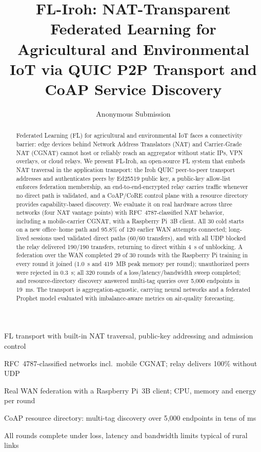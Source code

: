\documentclass[a4paper,fleqn]{cas-dc}
\begin{document}
\let\WriteBookmarks\relax
\def\floatpagepagefraction{1}
\def\textpagefraction{.001}


\title[mode = title]{FL-Iroh: NAT-Transparent Federated Learning for Agricultural and Environmental IoT via QUIC P2P Transport and CoAP Service Discovery}

\author{Anonymous Submission}

\begin{abstract}
Federated Learning (FL) for agricultural and environmental IoT faces a connectivity barrier: edge devices behind Network Address Translators (NAT) and Carrier-Grade NAT (CGNAT) cannot host or reliably reach an aggregator without static IPs, VPN overlays, or cloud relays. We present FL-Iroh, an open-source FL system that embeds NAT traversal in the application transport: the Iroh QUIC peer-to-peer transport addresses and authenticates peers by Ed25519 public key, a public-key allow-list enforces federation membership, an end-to-end-encrypted relay carries traffic whenever no direct path is validated, and a CoAP/CoRE control plane with a resource directory provides capability-based discovery. We evaluate it on real hardware across three networks (four NAT vantage points) with RFC~4787-classified NAT behavior, including a mobile-carrier CGNAT, with a Raspberry Pi~3B client. All 30 cold starts on a new office--home path and 95.8\% of 120 earlier WAN attempts connected; long-lived sessions used validated direct paths (60/60 transfers), and with all UDP blocked the relay delivered 190/190 transfers, returning to direct within 4~s of unblocking. A federation over the WAN completed 29 of 30 rounds with the Raspberry Pi training in every round it joined (1.0~s and 419~MB peak memory per round); unauthorized peers were rejected in 0.3~s; all 320 rounds of a loss/latency/bandwidth sweep completed; and resource-directory discovery answered multi-tag queries over 5{,}000 endpoints in 19~ms. The transport is aggregation-agnostic, carrying neural networks and a federated Prophet model evaluated with imbalance-aware metrics on air-quality forecasting.
\end{abstract}

\begin{highlights}
\item FL transport with built-in NAT traversal, public-key addressing and admission control
\item RFC~4787-classified networks incl.\ mobile CGNAT; relay delivers 100\% without UDP
\item Real WAN federation with a Raspberry Pi~3B client; CPU, memory and energy per round
\item CoAP resource directory: multi-tag discovery over 5{,}000 endpoints in tens of ms
\item All rounds complete under loss, latency and bandwidth limits typical of rural links
\end{highlights}
\end{document}
